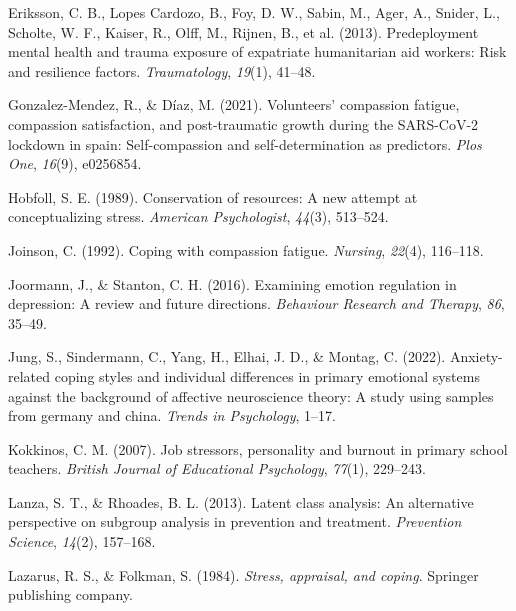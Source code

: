 \documentclass[
  man]{apa7}
\newlength{\cslhangindent}
\newlength{\cslentryspacingunit} %
\newenvironment{CSLReferences}[2] %
 {%
  \setlength{\parindent}{0pt}
  \ifodd #1
  \let\oldpar\par
  \def\par{\hangindent=\cslhangindent\oldpar}
  \fi
  \setlength{\parskip}{#2\cslentryspacingunit}
 }%
 {}
\begin{document}
\begin{CSLReferences}{1}{0}
\leavevmode{}%
Eriksson, C. B., Lopes Cardozo, B., Foy, D. W., Sabin, M., Ager, A., Snider, L., Scholte, W. F., Kaiser, R., Olff, M., Rijnen, B., et al. (2013). Predeployment mental health and trauma exposure of expatriate humanitarian aid workers: Risk and resilience factors. \emph{Traumatology}, \emph{19}(1), 41--48.

\leavevmode{}%
Gonzalez-Mendez, R., \& Díaz, M. (2021). Volunteers' compassion fatigue, compassion satisfaction, and post-traumatic growth during the SARS-CoV-2 lockdown in spain: Self-compassion and self-determination as predictors. \emph{Plos One}, \emph{16}(9), e0256854.

\leavevmode{}%
Hobfoll, S. E. (1989). Conservation of resources: A new attempt at conceptualizing stress. \emph{American Psychologist}, \emph{44}(3), 513--524.

\leavevmode{}%
Joinson, C. (1992). Coping with compassion fatigue. \emph{Nursing}, \emph{22}(4), 116--118.

\leavevmode{}%
Joormann, J., \& Stanton, C. H. (2016). Examining emotion regulation in depression: A review and future directions. \emph{Behaviour Research and Therapy}, \emph{86}, 35--49.

\leavevmode{}%
Jung, S., Sindermann, C., Yang, H., Elhai, J. D., \& Montag, C. (2022). Anxiety-related coping styles and individual differences in primary emotional systems against the background of affective neuroscience theory: A study using samples from germany and china. \emph{Trends in Psychology}, 1--17.

\leavevmode{}%
Kokkinos, C. M. (2007). Job stressors, personality and burnout in primary school teachers. \emph{British Journal of Educational Psychology}, \emph{77}(1), 229--243.

\leavevmode{}%
Lanza, S. T., \& Rhoades, B. L. (2013). Latent class analysis: An alternative perspective on subgroup analysis in prevention and treatment. \emph{Prevention Science}, \emph{14}(2), 157--168.

\leavevmode{}%
Lazarus, R. S., \& Folkman, S. (1984). \emph{Stress, appraisal, and coping}. Springer publishing company.


\end{CSLReferences}
\end{document}
